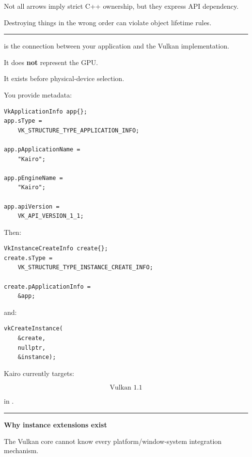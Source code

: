 Not all arrows imply strict C++ ownership, but they express API dependency.

Destroying things in the wrong order can violate object lifetime rules.

\begin{center}\rule{0.5\linewidth}{0.5pt}\end{center}

\textbf{}

 is the connection between your application and the Vulkan implementation.

It does \textbf{not} represent the GPU.

It exists before physical-device selection.

You provide metadata:

\begin{verbatim}
VkApplicationInfo app{};
app.sType =
    VK_STRUCTURE_TYPE_APPLICATION_INFO;

app.pApplicationName =
    "Kairo";

app.pEngineName =
    "Kairo";

app.apiVersion =
    VK_API_VERSION_1_1;
\end{verbatim}

Then:

\begin{verbatim}
VkInstanceCreateInfo create{};
create.sType =
    VK_STRUCTURE_TYPE_INSTANCE_CREATE_INFO;

create.pApplicationInfo =
    &app;
\end{verbatim}

and:

\begin{verbatim}
vkCreateInstance(
    &create,
    nullptr,
    &instance);
\end{verbatim}

Kairo currently targets:

\[
\boxed{\text{Vulkan 1.1}}
\]

in .

\begin{center}\rule{0.5\linewidth}{0.5pt}\end{center}

\textbf{Why instance extensions exist}

The Vulkan core cannot know every platform/window-system integration mechanism.

